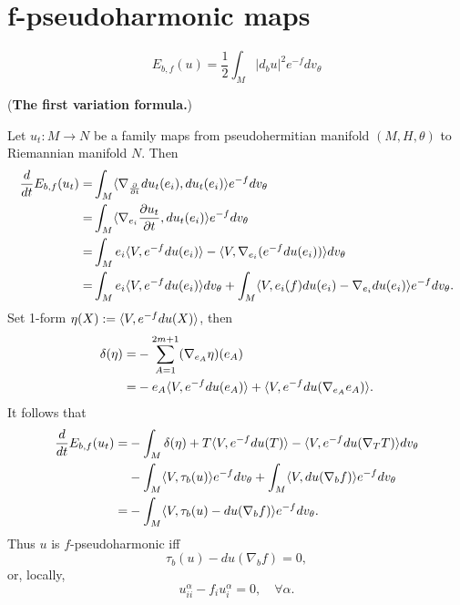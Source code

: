 \documentclass[a4paper,12pt]{article}
\begin{document}
\section{f-pseudoharmonic maps}

\begin{equation}
    E_{b,f}(u)=\frac{1}{2}\int_{M}|d_b u|^2 e^{-f} dv_{\theta }
\end{equation}

\np (\textbf{The first variation formula.})

Let $u_t:M \to N$ be a family maps from pseudohermitian manifold $(M, H, \theta ) $ to Riemannian manifold $N$.
Then 
$$ \begin{aligned}
    \frac{d}{dt} E_{b,f}(u_t)=& \int_{M} \langle \nabla _{\frac{\partial }{\partial t}} d u_t(e_i),du_t(e_i)  \rangle e^{-f} dv_{\theta }\\
    =& \int_{M}^{} \langle \nabla _{e_i} \frac{\partial u_t}{\partial t},du_t(e_i)  \rangle e^{-f} dv_{\theta }\\
    =& \int_{M}^{} e_i \langle V,e^{-f}du(e_i)  \rangle -\langle V, \nabla _{e_i} (e^{-f}du(e_i))  \rangle
    dv_{\theta }\\
    =& \int_{M}  e_i \langle V,e^{-f}du(e_i)  \rangle dv_{\theta }
    +\int_{M} \langle V,  e_i(f) du(e_i) -\nabla _{e_i} du(e_i)\rangle e^{-f} 
    dv_{\theta }.
\end{aligned}  $$   
Set 1-form $\eta (X):=\langle V,e^{-f}du(X)  \rangle$, then  
$$\begin{aligned}
    \delta (\eta )=&-\sum_{A=1}^{2m+1} (\nabla _{e_A} \eta) (e_A)\\
    =& -e_A \langle V, e^{-f}du(e_A)  \rangle +\langle V, e^{-f} du(\nabla _{e_A}e_A)  \rangle .
\end{aligned}   $$
It follows that 
$$ \begin{aligned}
    \frac{d}{dt} E_{b,f}(u_t)=& -\int_{M} \delta (\eta )+T\langle V , e^{-f}du(T) \rangle -\langle V , e^{-f} du(\nabla _{T}T) \rangle dv_{\theta }\\
    &-\int_{M} \langle V, \tau _b (u) \rangle e^{-f} dv_{\theta }+\int_{M} \langle V, du(\nabla _b f) \rangle e^{-f}dv_\theta \\
    =& - \int_{M}\langle V, \tau _b (u) -du(\nabla _b f)\rangle e^{-f}dv_\theta .
\end{aligned}  $$
Thus $u$ is $f$-pseudoharmonic iff 
\begin{equation}
    \tau _b (u) -du(\nabla _b f)=0,
\end{equation} 
or, locally,
\begin{equation}
    u_{ii }^{\alpha  }-f_i u_{i }^{\alpha }=0, \quad \forall \alpha .
\end{equation}
\end{document}
